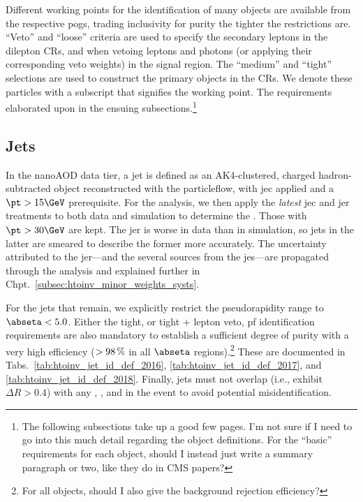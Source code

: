 Different working points for the identification of many objects are available from the respective \glspl{pog}, trading inclusivity for purity the tighter the restrictions are. ``Veto'' and ``loose'' criteria are used to specify the secondary leptons in the dilepton \glspl{CR}, and when vetoing leptons and photons (or applying their corresponding veto weights) in the signal region. The ``medium'' and ``tight'' selections are used to construct the primary objects in the \glspl{CR}. We denote these particles with a subscript that signifies the working point. The requirements elaborated upon in the ensuing subsections.\footnote{The following subsections take up a good few pages. I'm not sure if I need to go into this much detail regarding the object definitions. For the ``basic'' requirements for each object, should I instead just write a summary paragraph or two, like they do in CMS papers?}




\subsection{Jets}
\label{subsec:objects_jets}

In the nanoAOD data tier, a \gls{jet} is defined as an AK4-clustered, charged hadron-subtracted object reconstructed with the \gls{particleflow}, with \acrlong{jec} applied and a $\pt > \text{15}\GeV$ prerequisite. For the analysis, we then apply the \emph{latest} \acrshort{jec} and \acrfull{jer} treatments to both data and simulation to determine the \pt. Those with $\pt > \text{30}\GeV$ are kept. The \acrshort{jer} is worse in data than in simulation, so \glspl{jet} in the latter are smeared to describe the former more accurately. The uncertainty attributed to the \acrshort{jer}---and the several sources from the \acrfull{jes}---are propagated through the analysis and explained further in Chpt.~\ref{subsec:htoinv_minor_weights_systs}.


For the \glspl{jet} that remain, we explicitly restrict the pseudorapidity range to $\abseta < \text{5.0}$. Either the tight, or tight $+$ lepton veto, \acrshort{pf} identification requirements are also mandatory to establish a sufficient degree of purity with a very high efficiency ($> \text{98\,\%}$ in all $\abseta$ regions).\footnote{For all objects, should I also give the background rejection efficiency?} These are documented in Tabs.~\ref{tab:htoinv_jet_id_def_2016}, \ref{tab:htoinv_jet_id_def_2017}, and \ref{tab:htoinv_jet_id_def_2018}. Finally, \glspl{jet} must not overlap (i.e., exhibit $\Delta R > \text{0.4}$) with any \vetoEle, \looseMuon, and \loosePhoton in the event to avoid potential misidentification.

